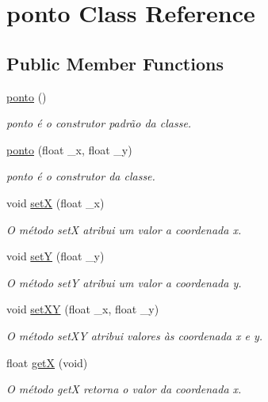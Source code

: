 \hypertarget{classponto}{}\section{ponto Class Reference}
\label{classponto}
\subsection*{Public Member Functions}
\begin{DoxyCompactItemize}
\item 
\hyperlink{classponto_a0ac1f12232a221c3d283e27b2e367d0d}{ponto} ()
\begin{DoxyCompactList}\small\item\em ponto é o construtor padrão da classe. \end{DoxyCompactList}\item 
\hyperlink{classponto_a6d6d40e6c14e903c65c48988b65fb649}{ponto} (float \+\_\+x, float \+\_\+y)
\begin{DoxyCompactList}\small\item\em ponto é o construtor da classe. \end{DoxyCompactList}\item 
void \hyperlink{classponto_a64ff8ce435f3626995f535671a21403d}{setX} (float \+\_\+x)
\begin{DoxyCompactList}\small\item\em O método setX atribui um valor a coordenada x. \end{DoxyCompactList}\item 
void \hyperlink{classponto_acf9918cb8a31b1f74e7425acee366322}{setY} (float \+\_\+y)
\begin{DoxyCompactList}\small\item\em O método setY atribui um valor a coordenada y. \end{DoxyCompactList}\item 
void \hyperlink{classponto_a29ac118d16c126d9d13ae8daff2f13cf}{set\+XY} (float \+\_\+x, float \+\_\+y)
\begin{DoxyCompactList}\small\item\em O método set\+XY atribui valores às coordenada x e y. \end{DoxyCompactList}\item 
float \hyperlink{classponto_a4678950a1117e45b149f9a7cd3bb114d}{getX} (void)
\begin{DoxyCompactList}\small\item\em O método getX retorna o valor da coordenada x. \end{DoxyCompactList}\item 

\end{DoxyCompactItemize}
